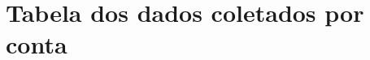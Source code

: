 \documentclass[oneside,openright,12pt]{ufsm_2015} %
\begin{document}

	
\apendice %

        
\anexo    %

    \chapter{Tabela dos dados coletados por conta}
    \label{anexo-tebela-contas}
    
\end{document}
